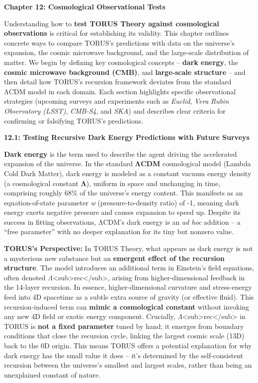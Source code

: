 \textbf{Chapter 12: Cosmological Observational Tests}

Understanding how to \textbf{test TORUS Theory against cosmological
observations} is critical for establishing its validity. This chapter
outlines concrete ways to compare TORUS's predictions with data on the
universe's expansion, the cosmic microwave background, and the
large-scale distribution of matter. We begin by defining key
cosmological concepts -- \textbf{dark energy}, the \textbf{cosmic
microwave background (CMB)}, and \textbf{large-scale structure} -- and
then detail how TORUS's recursion framework deviates from the standard
ΛCDM model in each domain. Each section highlights specific
observational strategies (upcoming surveys and experiments such as
\emph{Euclid}, \emph{Vera Rubin Observatory (LSST)}, \emph{CMB-S4}, and
\emph{SKA}) and describes clear criteria for confirming or falsifying
TORUS's predictions.

\textbf{12.1: Testing Recursive Dark Energy Predictions with Future
Surveys}

\textbf{Dark energy} is the term used to describe the agent driving the
accelerated expansion of the universe. In the standard \textbf{ΛCDM}
cosmological model (Lambda Cold Dark Matter), dark energy is modeled as
a constant vacuum energy density (a cosmological constant \textbf{Λ}),
uniform in space and unchanging in time, comprising roughly 68\% of the
universe's energy content. This manifests as an equation-of-state
parameter \emph{w} (pressure-to-density ratio) of -1, meaning dark
energy exerts negative pressure and causes expansion to speed up.
Despite its success in fitting observations, ΛCDM's dark energy is an
\emph{ad hoc} addition -- a ``free parameter'' with no deeper
explanation for its tiny but nonzero value.

\textbf{TORUS's Perspective:} In TORUS Theory, what appears as dark
energy is not a mysterious new substance but an \textbf{emergent effect
of the recursion structure}. The model introduces an additional term in
Einstein's field equations, often denoted
\emph{Λ}\textless{}sub\textgreater{}rec\textless{}/sub\textgreater{},
arising from higher-dimensional feedback in the 14-layer recursion​. In
essence, higher-dimensional curvature and stress-energy feed into 4D
spacetime as a subtle extra source of gravity (or effective fluid)​.
This recursion-induced term can \textbf{mimic a cosmological constant}
without invoking any new 4D field or exotic energy component​.
Crucially,
\emph{Λ}\textless{}sub\textgreater{}rec\textless{}/sub\textgreater{} in
TORUS is \textbf{not a fixed parameter} tuned by hand; it emerges from
boundary conditions that close the recursion cycle, linking the largest
cosmic scale (13D) back to the 0D origin​. This means TORUS offers a
potential explanation for why dark energy has the small value it does --
it's determined by the self-consistent recursion between the universe's
smallest and largest scales, rather than being an unexplained constant
of nature.

